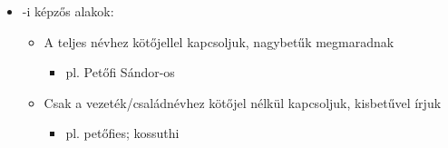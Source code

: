 \documentclass{article}
\begin{document}
\begin{itemize}
    \item -i képzős alakok: 
    \begin{itemize}
        \item A teljes névhez kötőjellel kapcsoljuk, nagybetűk megmaradnak
        \begin{itemize}
            \item pl. Petőfi Sándor-os
        \end{itemize}
        \item Csak a vezeték/családnévhez kötőjel nélkül kapcsoljuk, kisbetűvel írjuk
        \begin{itemize}
            \item pl. petőfies; kossuthi
        \end{itemize}
    \end{itemize}
\end{itemize}
\end{document}
